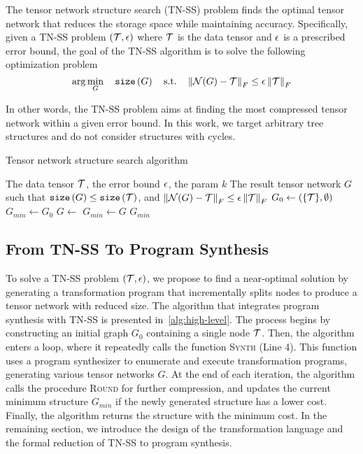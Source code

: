 \begin{definition}
The tensor network structure search (TN-SS) problem finds the optimal tensor network that reduces the storage space while maintaining accuracy. Specifically, given a TN-SS problem $(\mathcal{T}, \epsilon)$ where $\mathcal{T}$ is the data tensor and $\epsilon$ is a prescribed error bound, the goal of the TN-SS algorithm is to solve the following optimization problem
$$
\arg\min_{G} \quad \mathtt{size}\left(G\right) \quad
\textrm{s.t.} \quad \left\lVert\mathcal{N}(G) - \mathcal{T}\right\rVert_{F}\leq \epsilon\left\lVert\mathcal{T}\right\rVert_{F}
$$
\end{definition}
In other words, the TN-SS problem aims at finding the most compressed tensor network within a given error bound.
%
In this work, we target arbitrary tree structures and do not consider structures with cycles.

\begin{algorithm}[t]
\small
\captionsetup{font=small} %
\caption{Tensor network structure search algorithm}\label{alg:high-level}
\begin{algorithmic}[1]
    \Require The data tensor $\mathcal{T}$, the error bound $\epsilon$, the param $k$
    \Ensure The result tensor network $G$ such that $\mathtt{size}\left(G\right) \leq \mathtt{size}\left(\mathcal{T}\right)$, and $\left\lVert\mathcal{N}(G) - \mathcal{T}\right\rVert_{F} \leq \epsilon \left\lVert\mathcal{T}\right\rVert_{F}$
        \State $G_0 \gets (\{\mathcal{T}\}, \emptyset)$
        \State $G_{min} \gets G_0$
            \State $G \gets$ 
                \State $G_{min} \gets G$
            \EndIf
        \EndFor
        \State \Return $G_{min}$
    \EndFunction
\end{algorithmic}
\end{algorithm}

\subsection{From TN-SS To Program Synthesis}\label{sec:algo:program}
%
To solve a TN-SS problem $(\mathcal{T},\epsilon)$, we propose to find a near-optimal solution by generating a transformation program that incrementally splits nodes to produce a tensor network with reduced size.
%
The algorithm that integrates program synthesis with TN-SS is presented in~\cref{alg:high-level}.
%
The process begins by constructing an initial graph $G_0$ containing a single node $\mathcal{T}$.
%
Then, the algorithm enters a loop, where it repeatedly calls the function \textsc{Synth} (Line 4).
%
This function uses a program synthesizer to enumerate and execute transformation programs, generating various tensor networks $G$.
%
At the end of each iteration, the algorithm calls the procedure \textsc{Round} for further compression, and updates the current minimum structure $G_{min}$ if the newly generated structure has a lower cost.
%
Finally, the algorithm returns the structure with the minimum cost.
%
In the remaining section, we introduce the design of the transformation language and the formal reduction of TN-SS to program synthesis.

